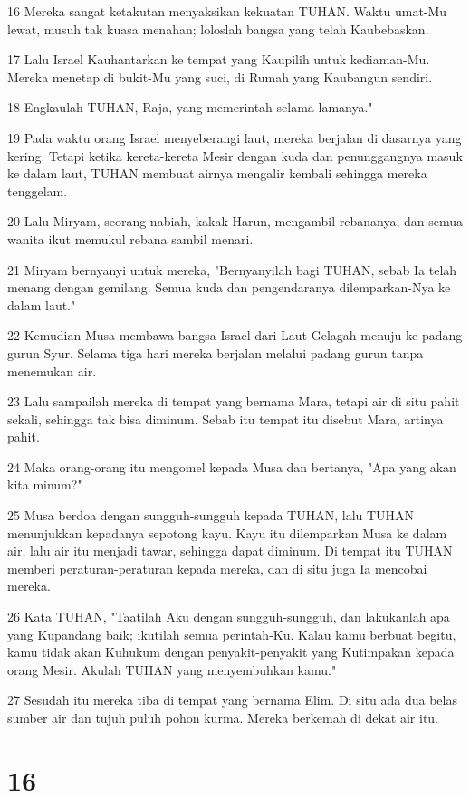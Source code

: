 \par 16 Mereka sangat ketakutan menyaksikan kekuatan TUHAN. Waktu umat-Mu lewat, musuh tak kuasa menahan; loloslah bangsa yang telah Kaubebaskan.
\par 17 Lalu Israel Kauhantarkan ke tempat yang Kaupilih untuk kediaman-Mu. Mereka menetap di bukit-Mu yang suci, di Rumah yang Kaubangun sendiri.
\par 18 Engkaulah TUHAN, Raja, yang memerintah selama-lamanya."
\par 19 Pada waktu orang Israel menyeberangi laut, mereka berjalan di dasarnya yang kering. Tetapi ketika kereta-kereta Mesir dengan kuda dan penunggangnya masuk ke dalam laut, TUHAN membuat airnya mengalir kembali sehingga mereka tenggelam.
\par 20 Lalu Miryam, seorang nabiah, kakak Harun, mengambil rebananya, dan semua wanita ikut memukul rebana sambil menari.
\par 21 Miryam bernyanyi untuk mereka, "Bernyanyilah bagi TUHAN, sebab Ia telah menang dengan gemilang. Semua kuda dan pengendaranya dilemparkan-Nya ke dalam laut."
\par 22 Kemudian Musa membawa bangsa Israel dari Laut Gelagah menuju ke padang gurun Syur. Selama tiga hari mereka berjalan melalui padang gurun tanpa menemukan air.
\par 23 Lalu sampailah mereka di tempat yang bernama Mara, tetapi air di situ pahit sekali, sehingga tak bisa diminum. Sebab itu tempat itu disebut Mara, artinya pahit.
\par 24 Maka orang-orang itu mengomel kepada Musa dan bertanya, "Apa yang akan kita minum?"
\par 25 Musa berdoa dengan sungguh-sungguh kepada TUHAN, lalu TUHAN menunjukkan kepadanya sepotong kayu. Kayu itu dilemparkan Musa ke dalam air, lalu air itu menjadi tawar, sehingga dapat diminum. Di tempat itu TUHAN memberi peraturan-peraturan kepada mereka, dan di situ juga Ia mencobai mereka.
\par 26 Kata TUHAN, "Taatilah Aku dengan sungguh-sungguh, dan lakukanlah apa yang Kupandang baik; ikutilah semua perintah-Ku. Kalau kamu berbuat begitu, kamu tidak akan Kuhukum dengan penyakit-penyakit yang Kutimpakan kepada orang Mesir. Akulah TUHAN yang menyembuhkan kamu."
\par 27 Sesudah itu mereka tiba di tempat yang bernama Elim. Di situ ada dua belas sumber air dan tujuh puluh pohon kurma. Mereka berkemah di dekat air itu.

\chapter{16}

